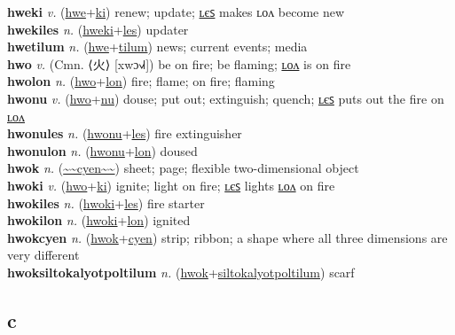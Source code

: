 \textbf{hweki} \textit{v.} (\hyperref[hwe]{hwe}+\hyperref[ki]{ki})
renew; update; \hyperref[hwekiles]{ʟєꜱ} makes ʟᴏᴧ become new \label{hweki} \\
\textbf{hwekiles} \textit{n.} (\hyperref[hweki]{hweki}+\hyperref[les]{les})
updater \label{hwekiles} \\
\textbf{hwetilum} \textit{n.} (\hyperref[hwe]{hwe}+\hyperref[tilum]{tilum})
news; current events; media \label{hwetilum} \\
\textbf{hwo} \textit{v.} (Cmn. ⟨火⟩ [xwɔ˧˩˧])
be on fire; be flaming; \hyperref[hwolon]{ʟᴏᴧ} is on fire \label{hwo} \\
\textbf{hwolon} \textit{n.} (\hyperref[hwo]{hwo}+\hyperref[lon]{lon})
fire; flame; on fire; flaming \label{hwolon} \\
\textbf{hwonu} \textit{v.} (\hyperref[hwo]{hwo}+\hyperref[nu]{nu})
douse; put out; extinguish; quench; \hyperref[hwonules]{ʟєꜱ} puts out the fire on \hyperref[hwonulon]{ʟᴏᴧ} \label{hwonu} \\
\textbf{hwonules} \textit{n.} (\hyperref[hwonu]{hwonu}+\hyperref[les]{les})
fire extinguisher \label{hwonules} \\
\textbf{hwonulon} \textit{n.} (\hyperref[hwonu]{hwonu}+\hyperref[lon]{lon})
doused \label{hwonulon} \\
\textbf{hwok} \textit{n.} (\hyperref[cyen]{\~{}\~{}cyen\~{}\~{}})
sheet; page; flexible two-dimensional object \label{hwok} \\
\textbf{hwoki} \textit{v.} (\hyperref[hwo]{hwo}+\hyperref[ki]{ki})
ignite; light on fire; \hyperref[hwokiles]{ʟєꜱ} lights \hyperref[hwokilon]{ʟᴏᴧ} on fire \label{hwoki} \\
\textbf{hwokiles} \textit{n.} (\hyperref[hwoki]{hwoki}+\hyperref[les]{les})
fire starter \label{hwokiles} \\
\textbf{hwokilon} \textit{n.} (\hyperref[hwoki]{hwoki}+\hyperref[lon]{lon})
ignited \label{hwokilon} \\
\textbf{hwokcyen} \textit{n.} (\hyperref[hwok]{hwok}+\hyperref[cyen]{cyen})
strip; ribbon; a shape where all three dimensions are very different \label{hwokcyen} \\
\textbf{hwoksiltokalyotpoltilum} \textit{n.} (\hyperref[hwok]{hwok}+\hyperref[siltokalyotpoltilum]{siltokalyotpoltilum})
scarf \label{hwoksiltokalyotpoltilum} \\
\subsection{c}

